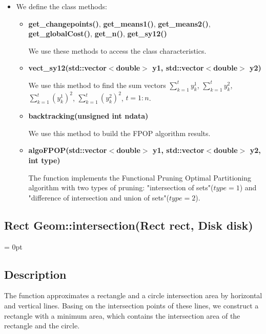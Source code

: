 \documentclass{report}
\begin{document}
\begin{itemize}
		\item We define the class methods:
		
		\begin{itemize}
			\item {\bfseries get\_changepoints()}, {\bfseries get\_means1()}, {\bfseries get\_means2()}, {\bfseries get\_globalCost()}, {\bfseries get\_n()}, {\bfseries get\_sy12()} 
			
			We use these  methods to access the class characteristics.
			
			\item {\bfseries vect\_sy12(std::vector$<$double$>$ y1, std::vector$<$double$>$ y2)}
			
			We use this method to find the sum vectors $\sum_{k=1}^{t} y^1_k$,  $\sum_{k=1}^{t}y^2_k
			$, $\sum_{k=1}^{t} (y^1_k)^2$,  $\sum_{k=1}^{t} (y^2_k)^2$, $t = 1:n$. 
			
			\item {\bfseries backtracking(unsigned int ndata)}
			
			We use this method to build the FPOP algorithm results. 
			
			
			\item {\bfseries algoFPOP(std::vector$<$double$>$ y1, std::vector$<$double$>$ y2, int type)} 
			
			The function implements the Functional Pruning Optimal Partitioning algorithm with two types of pruning: "intersection of sets"($type = 1$) and "difference of intersection and union of sets"($type = 2$).
		\end{itemize}
	\end{itemize}


\newpage
\newpage

\label{Intersection}	
\begin{center} 
	\section*{Rect Geom::intersection(Rect rect, Disk disk)}
\end{center}
\parindent = 0pt
\subsection*{Description}

The function approximates a rectangle and a circle intersection area by horizontal and vertical lines. Basing on the intersection points of these lines, we construct a rectangle with a minimum area, which contains the intersection area of the rectangle and the circle.
\end{document}
